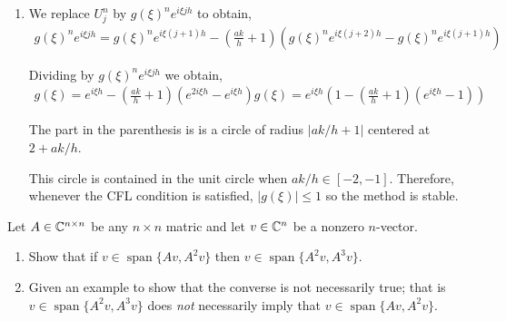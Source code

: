 \documentclass[10pt]{article}
\begin{document}
\begin{solution}[Solution]
\begin{enumerate}[label=(\alph*)]
    \item We replace \( U_j^{n} \) by \( g(\xi)^n e^{i\xi j h} \) to obtain,
        \begin{align*}
            g(\xi)^ne^{i\xi j h} = g(\xi)^n e^{i\xi(j+1)h} - \left( \frac{ak}{h} + 1 \right) \left( g(\xi)^n e^{i\xi(j+2)h} - g(\xi)^n e^{i\xi(j+1)h} \right)
        \end{align*}
       
        Dividing by \( g(\xi)^ne^{i\xi j h} \) we obtain,
        \begin{align*}
            g(\xi) = e^{i\xi h} - \left( \frac{ak}{h} + 1 \right) \left( e^{2i\xi h} - e^{i\xi h} \right)
            g(\xi) = e^{i\xi h}\left(1 - \left( \frac{ak}{h} + 1 \right) \left( e^{i\xi h} - 1 \right) \right)
        \end{align*}
        
        The part in the parenthesis is is a circle of radius \( |ak/h+1| \) centered at \( 2 + ak/h \).

        This circle is contained in the unit circle when \( ak/h \in[-2,-1] \). Therefore, whenever the CFL condition is satisfied, \( |g(\xi)| \leq 1 \) so the method is stable.

\end{enumerate}
\end{solution}



\begin{problem}
Let \( A\in\mathbb{C}^{n\times n} \) be any \( n\times n \) matric and let \( v\in\mathbb{C}^n \) be a nonzero \( n \)-vector.
\begin{enumerate}[nolistsep,label=(\alph*)]
    \item Show that if \( v\in\operatorname{span}\{Av,A^2v\} \) then \( v\in\operatorname{span}\{A^2v,A^3v\} \).
    \item Given an example to show that the converse is not necessarily true; that is \( v\in \operatorname{span}\{A^2v,A^3v\} \) does \textit{not} necessarily imply that \( v\in\operatorname{span}\{Av,A^2v\} \).
\end{enumerate}
\end{problem}
\end{document}

